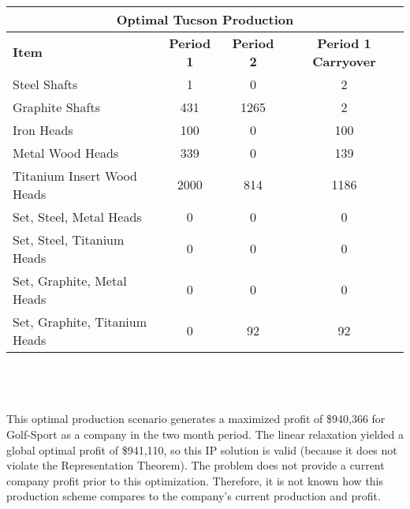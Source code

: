 \documentclass{article}
\begin{document}
\vspace{5mm}
\\
\noindent
\begin{tabular}{ l c c c }
\hline
\multicolumn{4}{|c|}{Optimal Tucson Production} \\
\hline
\textbf{Item} & \textbf{Period 1} & \textbf{Period 2} & \textbf{Period 1 Carryover} \\
Steel Shafts & 1 & 0 & 2 \\
Graphite Shafts & 431 & 1265 & 2 \\
Iron Heads & 100 & 0 & 100 \\
Metal Wood Heads & 339 & 0 & 139 \\
Titanium Insert Wood Heads & 2000 & 814 & 1186 \\
Set, Steel, Metal Heads & 0 & 0 & 0 \\
Set, Steel, Titanium Heads & 0 & 0 & 0 \\
Set, Graphite, Metal Heads & 0 & 0 & 0 \\
Set, Graphite, Titanium Heads & 0 & 92 & 92\\
\end{tabular}
\\
\\
\vspace{5mm}
\\

This optimal production scenario generates a maximized profit of \$940,366 for Golf-Sport as a company in the two month period.  The linear relaxation yielded a global optimal profit of \$941,110, so this 
IP solution is valid (because it does not violate the Representation Theorem).  The problem does not provide a current company profit prior to this optimization.  Therefore, it is not known how this production scheme compares to the company's current production and profit.
\end{document}
